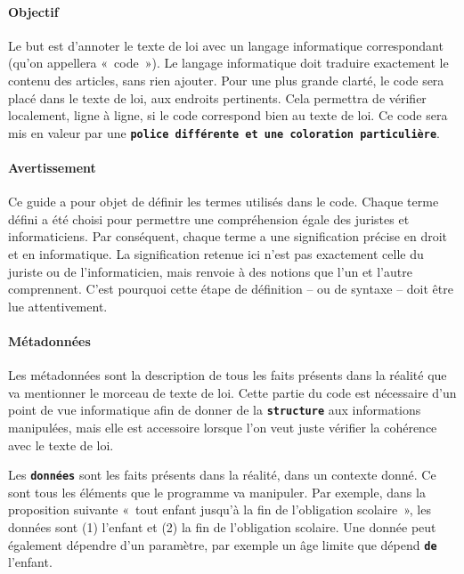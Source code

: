 \providecommand{\kw}[1]{\textbf{\textcolor{OliveGreen}{#1}}}
\providecommand{\inlinekw}[1]{\kw{\texttt{#1}}}
\providecommand{\cm}[1]{\textit{\texttt{\textcolor{PineGreen}{#1}}}}

\paragraph{Objectif} Le but est d’annoter le texte de loi avec un langage informatique correspondant (qu’on appellera « code »). Le langage informatique doit traduire exactement le contenu des articles, sans rien ajouter. Pour une plus grande clarté, le code sera placé dans le texte de loi, aux endroits pertinents. Cela permettra de vérifier localement, ligne à ligne, si le code correspond bien au texte de loi. Ce code sera mis en valeur par une \inlinekw{police différente et une coloration particulière}.

\paragraph{Avertissement} Ce guide a pour objet de définir les termes utilisés dans le code. Chaque terme défini a été choisi pour permettre une compréhension égale des juristes et informaticiens. Par conséquent, chaque terme a une signification précise en droit et en informatique. La signification retenue ici n’est pas exactement celle du juriste ou de l’informaticien, mais renvoie à des notions que l’un et l’autre comprennent. C’est pourquoi cette étape de définition -- ou de syntaxe -- doit être lue attentivement.

\paragraph{Métadonnées} Les métadonnées sont la description de tous les faits présents dans la réalité que va mentionner le morceau de texte de loi. Cette partie du code est nécessaire d'un point de vue informatique afin de donner de la \inlinekw{structure} aux informations manipulées, mais elle est accessoire lorsque l'on veut juste vérifier la cohérence avec le texte de loi.

Les \inlinekw{données} sont les faits présents dans la réalité, dans un contexte donné. Ce sont tous les éléments que le programme va manipuler. Par exemple, dans la proposition suivante « tout enfant jusqu’à la fin de l’obligation scolaire », les données sont (1) l'enfant  et (2) la fin de l’obligation scolaire. Une donnée peut également dépendre d'un paramètre, par exemple un âge limite que dépend \inlinekw{de} l'enfant.

